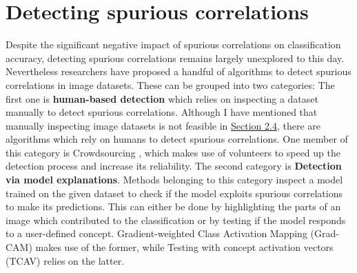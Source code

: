 \documentclass{article}
\begin{document}
\section{Detecting spurious correlations}
Despite the significant negative impact of spurious correlations on classification accuracy,
detecting spurious correlations remains largely unexplored to this day.
Nevertheless researchers have proposed a handful of algorithms to detect spurious correlations
in image datasets. These can be grouped into two categories: The first one is \textbf{human-based detection}
which relies on inspecting a dataset manually to detect spurious correlations. Although I have mentioned that
manually inspecting image datasets is not feasible in \hyperref[sec:challenges]{Section 2.4},
there are algorithms which rely on humans to detect spurious correlations. One member of this category is
Crowdsourcing \cite{10.1145/3366423.3380063}, which makes use of volunteers to speed up the detection process and increase its reliability.
The second category is \textbf{Detection via model explanations}. Methods belonging to this category inspect a model trained on
the given dataset to check if the model exploits spurious correlations to make its predictions.
This can either be done by highlighting the parts of an image which contributed to the classification or by testing if the
model responds to a user-defined concept. Gradient-weighted Class Activation Mapping (Grad-CAM) \cite{Selvaraju_2017_ICCV}
makes use of the former, while Testing with concept activation vectors (TCAV) \cite{pmlr-v80-kim18d} relies on the latter.
\end{document}
